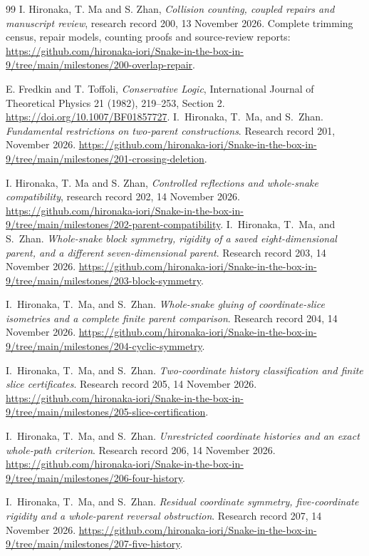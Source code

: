 \documentclass[11pt,a4paper]{article}
\theoremstyle{definition}
\theoremstyle{remark}
\begin{document}
\begin{thebibliography}{99}
I. Hironaka, T. Ma and S. Zhan,
\emph{Collision counting, coupled repairs and manuscript review},
research record 200, 13 November 2026. Complete trimming census,
repair models, counting proofs and source-review reports:
\url{https://github.com/hironaka-iori/Snake-in-the-box-in-9/tree/main/milestones/200-overlap-repair}.

E. Fredkin and T. Toffoli,
\emph{Conservative Logic}, International Journal of Theoretical Physics
21 (1982), 219--253, Section 2.
\url{https://doi.org/10.1007/BF01857727}.
I.~Hironaka, T.~Ma, and S.~Zhan. \emph{Fundamental restrictions on
two-parent constructions}. Research record 201, November 2026.
\url{https://github.com/hironaka-iori/Snake-in-the-box-in-9/tree/main/milestones/201-crossing-deletion}.

I. Hironaka, T. Ma and S. Zhan,
\emph{Controlled reflections and whole-snake compatibility},
research record 202, 14 November 2026.
\url{https://github.com/hironaka-iori/Snake-in-the-box-in-9/tree/main/milestones/202-parent-compatibility}.
I.~Hironaka, T.~Ma, and S.~Zhan. \emph{Whole-snake block symmetry,
rigidity of a saved eight-dimensional parent, and a different
seven-dimensional parent}. Research record 203, 14 November 2026.
\url{https://github.com/hironaka-iori/Snake-in-the-box-in-9/tree/main/milestones/203-block-symmetry}.

I.~Hironaka, T.~Ma, and S.~Zhan. \emph{Whole-snake gluing of
coordinate-slice isometries and a complete finite parent comparison}.
Research record 204, 14 November 2026.
\url{https://github.com/hironaka-iori/Snake-in-the-box-in-9/tree/main/milestones/204-cyclic-symmetry}.

I.~Hironaka, T.~Ma, and S.~Zhan. \emph{Two-coordinate history
classification and finite slice certificates}. Research record 205,
14 November 2026.
\url{https://github.com/hironaka-iori/Snake-in-the-box-in-9/tree/main/milestones/205-slice-certification}.

I.~Hironaka, T.~Ma, and S.~Zhan. \emph{Unrestricted coordinate
histories and an exact whole-path criterion}. Research record 206,
14 November 2026.
\url{https://github.com/hironaka-iori/Snake-in-the-box-in-9/tree/main/milestones/206-four-history}.

I.~Hironaka, T.~Ma, and S.~Zhan. \emph{Residual coordinate symmetry,
five-coordinate rigidity and a whole-parent reversal obstruction}.
Research record 207, 14 November 2026.
\url{https://github.com/hironaka-iori/Snake-in-the-box-in-9/tree/main/milestones/207-five-history}.


\end{thebibliography}
\end{document}
